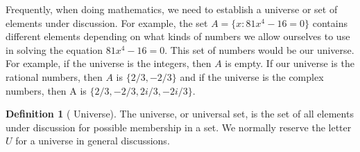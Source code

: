 \documentclass[10pt,]{book}
\theoremstyle{plain}
\theoremstyle{definition}
\newtheorem{definition}[theorem]{Definition}
\theoremstyle{definition}
\theoremstyle{definition}
\theoremstyle{definition}
\begin{document}
\par
Frequently, when doing mathematics, we need to establish a universe or set of elements under discussion. For example, the set \(A = \{x : 81x^4 -16 = 0 \}\) contains different elements depending on what kinds of numbers we allow ourselves to use in solving the equation \(81 x^4 -16 = 0\). This set of numbers would be our universe. For example, if the universe is the integers, then \(A\) is empty. If our universe is the
rational numbers, then \( A\) is \(\{2/3, -2/3\}\) and if the universe is the complex numbers, then A is \(\{2/3, -2/3, 2i/3, - 2i/3\}\).
%
\begin{definition}[ Universe]\label{universe.}
 The universe, or universal set, is the set of all elements under discussion for possible membership
in a set. We normally reserve the letter \( U\) for a universe in general discussions. %
\end{definition}
\typeout{************************************************}
\typeout{************************************************}
\end{document}
